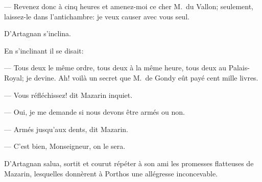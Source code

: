— Revenez donc à cinq heures et amenez-moi ce cher M.~du Vallon; seulement, laissez-le dans l'antichambre: je veux causer avec vous seul.

D'Artagnan s'inclina.

En s'inclinant il se disait:

— Tous deux le même ordre, tous deux à la même heure, tous deux au Palais-Royal; je devine. Ah! voilà un secret que M.~de Gondy eût payé cent mille livres.

— Vous réfléchissez! dit Mazarin inquiet.

— Oui, je me demande si nous devons être armés ou non.

— Armés jusqu'aux dents, dit Mazarin.

— C'est bien, Monseigneur, on le sera.

D'Artagnan salua, sortit et courut répéter à son ami les promesses flatteuses de Mazarin, lesquelles donnèrent à Porthos une allégresse inconcevable.